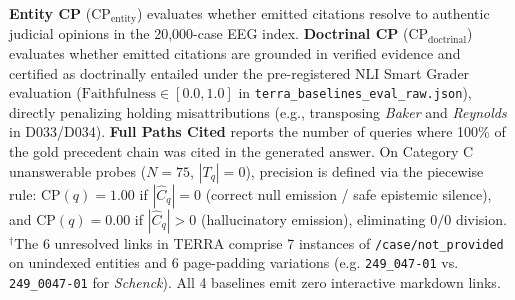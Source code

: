 \begin{table}[!t]
\textbf{Entity CP} ($\text{CP}_{\text{entity}}$) evaluates whether emitted citations resolve to authentic judicial opinions in the 20,000-case EEG index. 
\textbf{Doctrinal CP} ($\text{CP}_{\text{doctrinal}}$) evaluates whether emitted citations are grounded in verified evidence and certified as doctrinally entailed under the pre-registered NLI Smart Grader evaluation ($\text{Faithfulness} \in [0.0, 1.0]$ in \texttt{terra\_baselines\_eval\_raw.json}), directly penalizing holding misattributions (e.g., transposing \textit{Baker} and \textit{Reynolds} in D033/D034). 
\textbf{Full Paths Cited} reports the number of queries where 100\% of the gold precedent chain was cited in the generated answer. 
On Category C unanswerable probes ($N=75$, $|T_q|=0$), precision is defined via the piecewise rule: $\text{CP}(q) = 1.00$ if $|\hat{C}_q|=0$ (correct null emission / safe epistemic silence), and $\text{CP}(q) = 0.00$ if $|\hat{C}_q|>0$ (hallucinatory emission), eliminating $0/0$ division. 
$^\dagger$The 6 unresolved links in TERRA comprise 7 instances of \texttt{/case/not\_provided} on unindexed entities and 6 page-padding variations (e.g. \texttt{249\_047-01} vs. \texttt{249\_0047-01} for \textit{Schenck}). All 4 baselines emit zero interactive markdown links.
\end{table}
